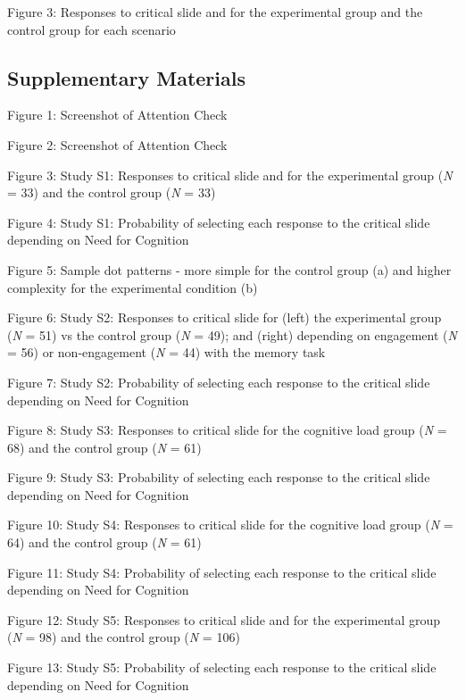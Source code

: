 \documentclass[
]{article}
\begin{document}
Figure 3: Responses to critical slide and for the experimental group and
the control group for each scenario

\hypertarget{supplementary-materials}{%
\subsection{Supplementary Materials}\label{supplementary-materials}}

Figure 1: Screenshot of Attention Check

Figure 2: Screenshot of Attention Check

Figure 3: Study S1: Responses to critical slide and for the experimental
group (\emph{N} = 33) and the control group (\emph{N} = 33)

Figure 4: Study S1: Probability of selecting each response to the
critical slide depending on Need for Cognition

Figure 5: Sample dot patterns - more simple for the control group (a)
and higher complexity for the experimental condition (b)

Figure 6: Study S2: Responses to critical slide for (left) the
experimental group (\emph{N} = 51) vs the control group (\emph{N} = 49);
and (right) depending on engagement (\emph{N} = 56) or non-engagement
(\emph{N} = 44) with the memory task

Figure 7: Study S2: Probability of selecting each response to the
critical slide depending on Need for Cognition

Figure 8: Study S3: Responses to critical slide for the cognitive load
group (\emph{N} = 68) and the control group (\emph{N} = 61)

Figure 9: Study S3: Probability of selecting each response to the
critical slide depending on Need for Cognition

Figure 10: Study S4: Responses to critical slide for the cognitive load
group (\emph{N} = 64) and the control group (\emph{N} = 61)

Figure 11: Study S4: Probability of selecting each response to the
critical slide depending on Need for Cognition

Figure 12: Study S5: Responses to critical slide and for the
experimental group (\emph{N} = 98) and the control group (\emph{N} =
106)

Figure 13: Study S5: Probability of selecting each response to the
critical slide depending on Need for Cognition
\end{document}
